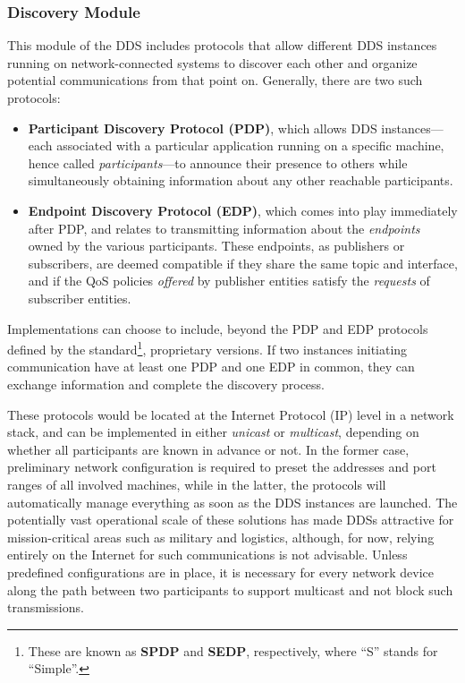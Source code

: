 \subsubsection{Discovery Module}
\label{sec:dds_discovery}
This module of the DDS includes protocols that allow different DDS instances running on network-connected systems to discover each other and organize potential communications from that point on. Generally, there are two such protocols:
\begin{itemize}
  \item \textbf{Participant Discovery Protocol (PDP)}, which allows DDS instances—each associated with a particular application running on a specific machine, hence called \emph{participants}—to announce their presence to others while simultaneously obtaining information about any other reachable participants.
  \item \textbf{Endpoint Discovery Protocol (EDP)}, which comes into play immediately after PDP, and relates to transmitting information about the \emph{endpoints} owned by the various participants. These endpoints, as publishers or subscribers, are deemed compatible if they share the same topic and interface, and if the QoS policies \emph{offered} by publisher entities satisfy the \emph{requests} of subscriber entities.
\end{itemize}
Implementations can choose to include, beyond the PDP and EDP protocols defined by the standard\footnote{These are known as \textbf{SPDP} and \textbf{SEDP}, respectively, where ``S'' stands for ``Simple''.}, proprietary versions. If two instances initiating communication have at least one PDP and one EDP in common, they can exchange information and complete the discovery process.

These protocols would be located at the Internet Protocol (IP) level in a network stack, and can be implemented in either \emph{unicast} or \emph{multicast}, depending on whether all participants are known in advance or not. In the former case, preliminary network configuration is required to preset the addresses and port ranges of all involved machines, while in the latter, the protocols will automatically manage everything as soon as the DDS instances are launched. The potentially vast operational scale of these solutions has made DDSs attractive for mission-critical areas such as military and logistics, although, for now, relying entirely on the Internet for such communications is not advisable. Unless predefined configurations are in place, it is necessary for every network device along the path between two participants to support multicast and not block such transmissions.

